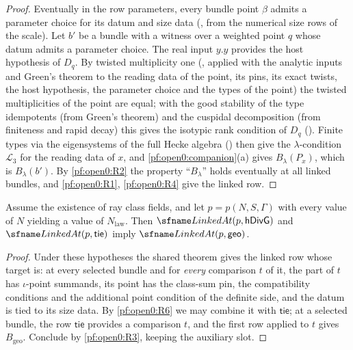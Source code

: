 \begin{proof}
Eventually in the row parameters, every bundle point $\beta$ admits a parameter choice for its datum and size data
(, from the numerical size rows of the scale). Let $b'$ be a bundle with
a witness over a weighted point $q$ whose datum admits a parameter choice. The real input $y.y$ provides the host
hypothesis of $D_q$. By twisted multiplicity one (, applied with the
analytic inputs and Green's theorem to the reading data of the point, its pins, its exact twists, the host hypothesis,
the parameter choice and the types of the point) the twisted multiplicities of the point are equal; with the good
stability of the type idempotents (from Green's theorem) and the cuspidal decomposition (from finiteness and rapid
decay) this gives the isotypic rank condition of $D_q$ (). Finite types
via the eigensystems of the full Hecke algebra ()
then give the $\lambda$-condition $\mathcal L_3$ for the reading data of $x$, and \cref{pf:open0:companion}(a) gives
$B_\lambda(P_x)$, which is $B_\lambda(b')$. By \ref{pf:open0:R2} the property ``$B_\lambda$'' holds eventually at all linked
bundles, and \ref{pf:open0:R1}, \ref{pf:open0:R4} give the linked row.
\end{proof}

\begin{proposition}\label{pf:open0:geo}
Assume the existence of ray class fields, and let $p=p(N,S,\Gamma)$ with every value of $N$ yielding a value of
$N_{\mathrm{law}}$. Then $\openzeroLinked(p,\mathsf{hDivG})$ and $\openzeroLinked(p,\mathsf{tie})$ imply $\openzeroLinked(p,\mathsf{geo})$.
\
\
\end{proposition}

\begin{proof}
Under these hypotheses the shared theorem  gives the linked row
whose target is: at every selected bundle and for \emph{every} comparison $t$ of it, the part of $t$ has $\iota$-point
summands, its point has the class-sum pin, the compatibility conditions and the additional point condition of the definite side, and the datum
is tied to its size data. By \ref{pf:open0:R6} we may combine it with $\mathsf{tie}$; at a selected bundle, the row
$\mathsf{tie}$ provides a comparison $t$, and the first row applied to $t$ gives $B_{\mathrm{geo}}$. Conclude by
\ref{pf:open0:R3}, keeping the auxiliary slot.
\end{proof}

